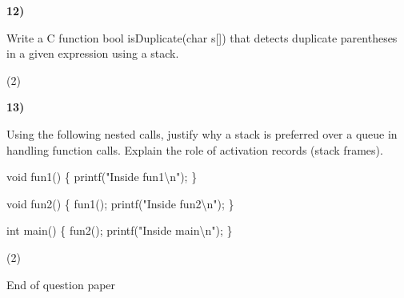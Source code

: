 \documentclass[10pt,a4paper]{article}
\newcommand{\question}[3]{\par\vspace{6pt}\noindent\begin{minipage}[t]{0.075\linewidth}\textbf{#1)}\end{minipage}\begin{minipage}[t]{0.855\linewidth}#3\end{minipage}\hfill\begin{minipage}[t]{0.055\linewidth}\raggedleft(#2)\end{minipage}\par}
\begin{document}
\question{12}{2}{Write a C function bool isDuplicate(char s[]) that detects duplicate parentheses in a given expression using a stack.}
\question{13}{2}{Using the following nested calls, justify why a stack is preferred over a queue in handling function calls. Explain the role of activation records (stack frames).\par void fun1() \{ printf("Inside fun1\textbackslash{}n"); \}\par void fun2() \{ fun1(); printf("Inside fun2\textbackslash{}n"); \}\par int main() \{ fun2(); printf("Inside main\textbackslash{}n"); \}}
\vfill\begin{center}\small End of question paper\end{center}
\end{document}
